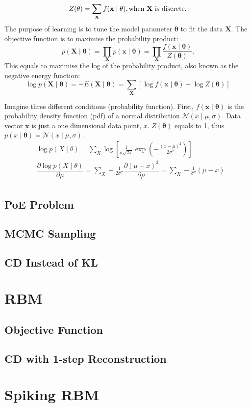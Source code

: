 \documentclass[11pt,twoside,a4paper]{article}
\begin{document}
\begin{equation}
Z( \mathbf{\theta}) = \sum_\mathbf{X} f(\mathbf{x} \mid \mathbf{\theta} ), \text{when  $ \mathbf{X} $ is discrete.}
\end{equation}
The purpose of learning is to tune the model parameter $ \mathbf{\theta} $ to fit the data $ \mathbf{X}  $. 
The objective function is to maximise the probability product:
\begin{equation}
 p(\mathbf{X} \mid \mathbf{\theta} ) = \prod_\mathbf{X} p(\mathbf{x} \mid \mathbf{\theta} ) =  \prod_\mathbf{X}\dfrac{f(\mathbf{x} \mid \mathbf{\theta} )}{Z( \mathbf{\theta})}.
\end{equation}
 This equals to maximise the log of the probability product, also known as the negative energy function:
\begin{equation}
  \log p(\mathbf{X} \mid \mathbf{\theta} ) = -E(\mathbf{X} \mid \mathbf{\theta} )  =  \sum_\mathbf{X}[\log f(\mathbf{x} \mid \mathbf{\theta} ) - \log Z( \mathbf{\theta})] 
\end{equation}

Imagine three different conditions (probability function).
First, $f(\mathbf{x} \mid \mathbf{\theta} )$ is the probability density function (pdf) of a normal distribution $\mathcal{N}(x \mid \mu, \sigma )$.
Data vector $ \mathbf{x} $ is just a one dimensional data point, $x$.
$ Z( \mathbf{\theta}) $ equals to 1, thus $p(x \mid \mathbf{\theta} ) = \mathcal{N}(x \mid \mu, \sigma )$.
\begin{equation}
\begin{split}
  &\log p(X \mid \theta ) =  \sum_X \log [\frac{1}{\sigma \sqrt{2\pi}} \exp(-\frac{(x-\mu)^{2}}{2\sigma^{2}})] \\
  &\dfrac{\partial  \log p(X \mid \theta ) }{\partial \mu}= \sum_X -\frac{1}{2\sigma^{2}}\dfrac{\partial (\mu-x)^{2}}{\partial \mu} = \sum_X -\frac{1}{\sigma^{2}}(\mu-x)\\
\end{split}
\end{equation}
\subsection{PoE Problem}
\subsection{MCMC Sampling}
\subsection{CD Instead of KL}
\section{RBM\cite{zhang2013rbm}}
\subsection{Objective Function}
\subsection{CD with 1-step Reconstruction}
\section{Spiking RBM\cite{neftci2013event}}

 

\end{document}

